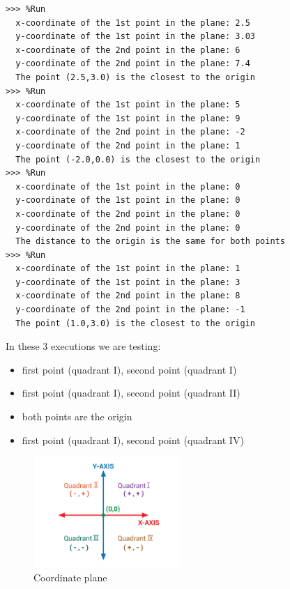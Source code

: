 \begin{enumerate}
\begin{Verbatim}[frame=single, label={\em example test execution of the program}]
>>> %Run 
  x-coordinate of the 1st point in the plane: 2.5
  y-coordinate of the 1st point in the plane: 3.03
  x-coordinate of the 2nd point in the plane: 6
  y-coordinate of the 2nd point in the plane: 7.4
  The point (2.5,3.0) is the closest to the origin
>>> %Run 
  x-coordinate of the 1st point in the plane: 5
  y-coordinate of the 1st point in the plane: 9
  x-coordinate of the 2nd point in the plane: -2
  y-coordinate of the 2nd point in the plane: 1
  The point (-2.0,0.0) is the closest to the origin
>>> %Run 
  x-coordinate of the 1st point in the plane: 0
  y-coordinate of the 1st point in the plane: 0
  x-coordinate of the 2nd point in the plane: 0
  y-coordinate of the 2nd point in the plane: 0
  The distance to the origin is the same for both points
>>> %Run 
  x-coordinate of the 1st point in the plane: 1
  y-coordinate of the 1st point in the plane: 3
  x-coordinate of the 2nd point in the plane: 8
  y-coordinate of the 2nd point in the plane: -1
  The point (1.0,3.0) is the closest to the origin
\end{Verbatim}
 
In these 3 executions we are testing:

\begin{itemize}
    \item first point (quadrant I), second point (quadrant I)
    \item first point (quadrant I), second point (quadrant II)
    \item both points are the origin
    \item first point (quadrant I), second point (quadrant IV)
\end{itemize}

\begin{figure}[H]
\centering
\includegraphics[width=0.5\textwidth]{images/quadrant.jpg}
\caption{Coordinate plane}
\label{fig:if}
\end{figure}


\end{enumerate}

